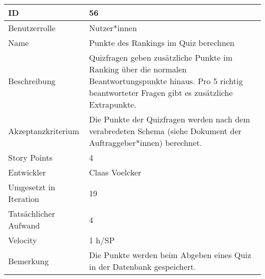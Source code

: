 \begin{tabularx}{\textwidth}{|p{}|X|}
	\hline
	ID & 56\\
	\hline
	Benutzerrolle & Nutzer*innen\\
	\hline
	Name & Punkte des Rankings im Quiz berechnen\\
	\hline
	Beschreibung & Quizfragen geben zusätzliche Punkte im Ranking über die normalen Beantwortungspunkte hinaus. Pro 5 richtig beantworteter Fragen gibt es zusätzliche Extrapunkte.\\
	\hline
	Akzeptanzkriterium & Die Punkte der Quizfragen werden nach dem verabredeten Schema (siehe Dokument der Auftraggeber*innen) berechnet.\\
	\hline
	Story Points & 4\\
	\hline
	Entwickler & Claas Voelcker\\
	\hline
	Umgesetzt in Iteration & 19\\
	\hline
	Tatsächlicher Aufwand & 4\\
	\hline
	Velocity & 1 h/SP\\
	\hline
	Bemerkung & Die Punkte werden beim Abgeben eines Quiz in der Datenbank gespeichert.\\
	\hline
\end{tabularx}
\vspace{20pt}
